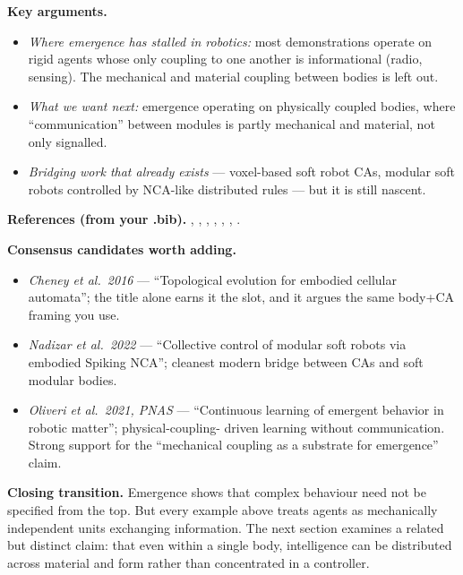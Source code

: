 \textbf{Key arguments.}
\begin{itemize}
    \item \emph{Where emergence has stalled in robotics:} most
          demonstrations operate on rigid agents whose only coupling
          to one another is informational (radio, sensing). The
          mechanical and material coupling between bodies is left out.
    \item \emph{What we want next:} emergence operating on physically
          coupled bodies, where ``communication'' between modules is
          partly mechanical and material, not only signalled.
    \item \emph{Bridging work that already exists} — voxel-based
          soft robot CAs, modular soft robots controlled by
          NCA-like distributed rules — but it is still nascent.
\end{itemize}

\textbf{References (from your .bib).}
\cite{romanishinMBlocksThreeDimensional2018},
\cite{wangRoboMatterReconfigurableMultifunctional2024},
\cite{eguchiFluidicSwarmEmbodimentSwarm2025},
\cite{mousaMultifunctionalFluidicUnits},
\cite{chattyEmergentComplexBehaviors2011},
\cite{kubicaComplexBehaviorsLocal2001},
\cite{zhangBioInspiredDistributedNeural}.

\textbf{Consensus candidates worth adding.}
\begin{itemize}
    \item \emph{Cheney et al.\ 2016} --- ``Topological evolution for
          embodied cellular automata''; the title alone earns it the
          slot, and it argues the same body+CA framing you use.
    \item \emph{Nadizar et al.\ 2022} --- ``Collective control of
          modular soft robots via embodied Spiking NCA''; cleanest
          modern bridge between CAs and soft modular bodies.
    \item \emph{Oliveri et al.\ 2021, PNAS} --- ``Continuous learning
          of emergent behavior in robotic matter''; physical-coupling-
          driven learning without communication. Strong support for
          the ``mechanical coupling as a substrate for emergence''
          claim.
\end{itemize}

\textbf{Closing transition.} Emergence shows that complex
behaviour need not be specified from the top. But every example
above treats agents as mechanically independent units exchanging
information. The next section examines a related but distinct claim:
that even within a single body, intelligence can be distributed
across material and form rather than concentrated in a controller.

